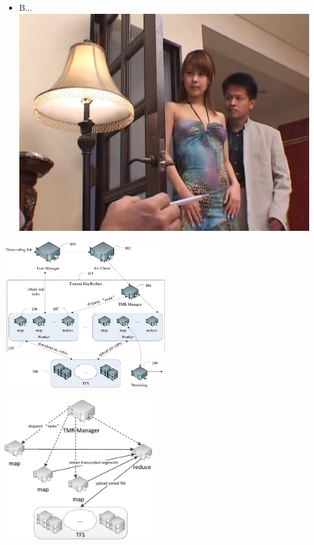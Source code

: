 \documentclass{beamer}
\begin{document}
\begin{frame}
\begin{itemize}
\item B...\\
\includegraphics[scale=0.40]{fig/bfj3.jpg}
\end{itemize}
\end{frame}

\begin{frame}
\begin{center}
\includegraphics[height=6.4cm]{fig/TranscX.pdf}
\end{center}
\end{frame}
\begin{frame}
\begin{center}
\includegraphics[height=6.2cm]{fig/TranscX_detail.pdf}
\end{center}
\end{frame}
\end{document}
